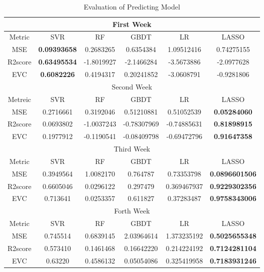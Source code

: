 \begin{table*}[!htbp]
\centering
\begin{tabular}{|c|c|c|c|c|c|}
\hline
\multicolumn{6}{|c|}{First Week}\\
\hline
Metric&SVR&RF&GBDT&LR&LASSO\\
\hline
MSE& \textbf{0.09393658}& 0.2683265 & 0.6354384 & 1.09512416 & 0.74275155\\
\hline
R2score & \textbf{0.63495534} &  -1.8019927	& -2.1466284&-3.5673886&-2.0977628\\
\hline
EVC&\textbf{0.6082226}&0.4194317&0.20241852&-3.0608791&-0.9281806\\
\hline
\multicolumn{6}{|c|}{Second Week}\\
\hline
Metreic & SVR&RF&GBDT&LR&LASSO\\
\hline
MSE&0.2716661&0.3192046&0.51210881&0.51052539&\textbf{0.05284060}\\
\hline
R2score&0.0693802&-1.0037243&-0.78307969&-0.74885631&\textbf{0.81898915}\\
\hline
EVC&0.1977912&-0.1190541&-0.08409798&-0.69472796&\textbf{0.91647358}\\
\hline
\multicolumn{6}{|c|}{Third Week}\\
\hline
Metric&SVR&RF&GBDT&LR&LASSO\\
\hline
MSE&0.3949564&1.0082170&0.764787&0.73353798&\textbf{0.0896601506}\\
\hline
R2score&0.6605046&0.0296122&0.297479&0.369467937&\textbf{0.9229302356}\\
\hline
EVC&0.713641&0.0253357&0.611827&0.37283487&\textbf{0.9758343006}\\
\hline
\multicolumn{6}{|c|}{Forth Week}\\
\hline
Metric&SVR&RF&GBDT&LR&LASSO\\
\hline
MSE&0.745514&0.6839145&2.03964614&1.373235192&\textbf{0.5025655348}\\
\hline
R2score&0.573410&0.1461468&0.16642220&0.214224192&\textbf{0.7124281104}\\
\hline
EVC&0.63220&0.4586132&0.05054086&0.325419958&\textbf{0.7183931246}\\
\hline
\end{tabular}
\caption{Evaluation of Predicting Model}
\end{table*}


